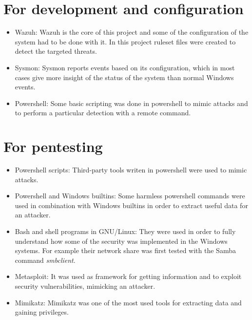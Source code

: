 \section{For development and configuration}
\begin{itemize}
	\item Wazuh: Wazuh\cite{wazuh} is the core of this project and some of the configuration of the system had to be done with it. In this project ruleset files were created to detect the targeted threats.
	\item Sysmon: Sysmon\cite{sysmon} reports events based on its configuration, which in most cases give more insight of the status of the system than normal Windows events.
	\item Powershell: Some basic scripting\cite{memoria_github} was done in powershell to mimic attacks and to perform a particular detection with a remote command.
\end{itemize}

\section{For pentesting}
\begin{itemize}
	\item Powershell scripts: Third-party tools writen in powershell were used to mimic attacks.
	\item Powershell and Windows builtins: Some harmless powershell commands were used in combination with Windows builtins in order to extract useful data for an attacker.
	\item Bash and shell programs in GNU/Linux: They were used in order to fully understand how some of the security was implemented in the Windows systems. For example their network share was first tested with the Samba command \textit{smbclient}.
	\item Metasploit: It was used as framework\cite{metasploit} for getting information and to exploit security vulnerabilities, mimicking an attacker.
	\item Mimikatz: Mimikatz\cite{mimikatz_github} was one of the most used tools for extracting data and gaining privileges.
\end{itemize}

